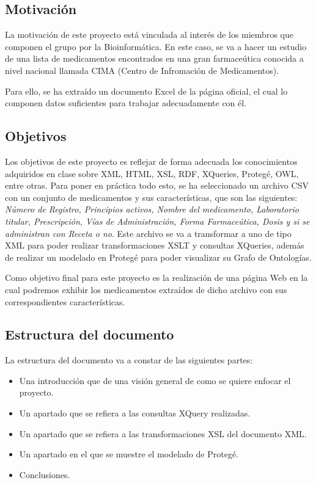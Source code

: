 \documentclass[../main.tex]{subfiles}
\begin{document}
\subsection{Motivación}
La motivación de este proyecto está vinculada al interés de los miembros que componen el grupo por la Bioinformática. En este caso, se va a hacer un estudio de una lista de medicamentos encontrados en una gran farmaceútica conocida a nivel nacional llamada CIMA (Centro de Infromación de Medicamentos).

Para ello, se ha extraído un documento Excel de la página oficial, el cual lo componen datos suficientes para trabajar adecuadamente con él.


\subsection{Objetivos}
Los objetivos de este proyecto es reflejar de forma adecuada los conocimientos adquiridos en clase sobre XML, HTML, XSL, RDF, XQueries, Protegé, OWL, entre otras. Para poner en práctica todo esto, se ha seleccionado un archivo CSV con un conjunto de medicamentos y sus características, que son las siguientes: \textit{Número de Registro, Principios activos, Nombre del medicamento, Laboratorio titular, Prescripción, Vías de Administración, Forma Farmaceútica, Dosis y si se administran con Receta o no}. Este archivo se va a transformar a uno de tipo XML para poder realizar transformaciones XSLT y consultas XQueries, además de realizar un modelado en Protegé para poder visualizar su Grafo de Ontologías. 

Como objetivo final para este proyecto es la realización de una página Web en la cual podremos exhibir los medicamentos extraídos de dicho archivo con sus correspondientes características.


\subsection{Estructura del documento}
La estructura del documento va a constar de las siguientes partes: 
\begin{itemize}
    \item Una introducción que de una visión general de como se quiere enfocar el proyecto.
    \item Un apartado que se refiera a las consultas XQuery realizadas.
    \item Un apartado que se refiera a las transformaciones XSL del documento XML.
    \item Un apartado en el que se muestre el modelado de Protegé. 
    \item Conclusiones.
\end{itemize}
\end{document}
